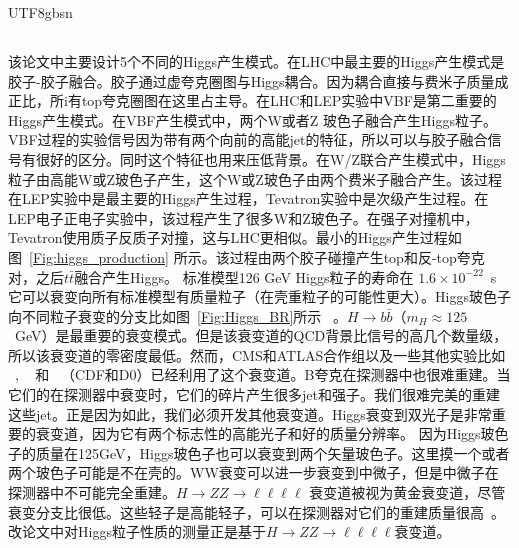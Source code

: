 \begin{CJK}{UTF8}{gbsn}
	\subsection{}\label{higgs_prod_dec_chinese}
该论文中主要设计5个不同的Higgs产生模式。在LHC中最主要的Higgs产生模式是胶子-胶子融合。胶子通过虚夸克圈图与Higgs耦合。因为耦合直接与费米子质量成正比，所i有top夸克圈图在这里占主导。在LHC和LEP实验中VBF是第二重要的Higgs产生模式。在VBF产生模式中，两个W或者Z 玻色子融合产生Higgs粒子。VBF过程的实验信号因为带有两个向前的高能jet的特征，所以可以与胶子融合信号有很好的区分。同时这个特征也用来压低背景。在W/Z联合产生模式中，Higgs粒子由高能W或Z玻色子产生，这个W或Z玻色子由两个费米子融合产生。该过程在LEP实验中是最主要的Higgs产生过程，Tevatron实验中是次级产生过程。在LEP电子正电子实验中，该过程产生了很多W和Z玻色子。在强子对撞机中，Tevatron使用质子反质子对撞，这与LHC更相似。最小的Higgs产生过程如图~\ref{Fig:higgs_production} 所示。该过程由两个胶子碰撞产生top和反-top夸克对，之后$t\bar{t}$融合产生Higgs。
标准模型126 GeV Higgs粒子的寿命在 $1.6\times10^{-22}$~s  它可以衰变向所有标准模型有质量粒子（在壳重粒子的可能性更大）。Higgs玻色子向不同粒子衰变的分支比如图~\ref{Fig:Higgs_BR}所示 ~\cite{Referenceb}。$H\rightarrow b\bar{b}$（$m_H \approx 125$ ~GeV）是最重要的衰变模式。但是该衰变道的QCD背景比信号的高几个数量级，所以该衰变道的零密度最低。然而，CMS和ATLAS合作组以及一些其他实验比如 ~\cite{Reference13}, ~\cite{Reference14} 和 ~\cite{Reference15}（CDF和D0）已经利用了这个衰变道。B夸克在探测器中也很难重建。当它们的在探测器中衰变时，它们的碎片产生很多jet和强子。我们很难完美的重建这些jet。正是因为如此，我们必须开发其他衰变道。Higgs衰变到双光子是非常重要的衰变道，因为它有两个标志性的高能光子和好的质量分辨率。
因为Higgs玻色子的质量在125GeV，Higgs玻色子也可以衰变到两个矢量玻色子。这里摸一个或者两个玻色子可能是不在壳的。WW衰变可以进一步衰变到中微子，但是中微子在探测器中不可能完全重建。$H \rightarrow ZZ \rightarrow \ell\ell\ell\ell$ 衰变道被视为黄金衰变道，尽管衰变分支比很低。这些轻子是高能轻子，可以在探测器对它们的重建质量很高~\cite{Referenceb}。改论文中对Higgs粒子性质的测量正是基于$H \rightarrow ZZ \rightarrow \ell\ell\ell\ell$衰变道。


\end{CJK}
